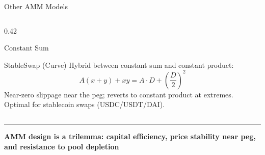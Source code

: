 \documentclass[8pt,aspectratio=169]{beamer}
\newcommand{\bottomnote}[1]{\vfill\vspace{-2mm}\textcolor{mllavender2}{\rule{\textwidth}{0.4pt}}\vspace{1mm}\footnotesize\textbf{#1}}
\begin{document}
\begin{frame}{Other AMM Models}
\begin{columns}[T]
\begin{column}{0.42\textwidth}
\begin{block}{Constant Sum}
      \end{block}
      \vspace{3mm}
      \begin{block}{StableSwap (Curve)}
        Hybrid between constant sum and constant product:
        \[
          A(x+y) + xy = A \cdot D + \left(\frac{D}{2}\right)^2
        \]
        Near-zero slippage near the peg; reverts to constant product at extremes. Optimal for
        stablecoin swaps (USDC/USDT/DAI).
      \end{block}
    \end{column}
  \end{columns}
  \bottomnote{AMM design is a trilemma: capital efficiency, price stability near peg, and resistance to pool depletion}
\end{frame}

\end{document}
